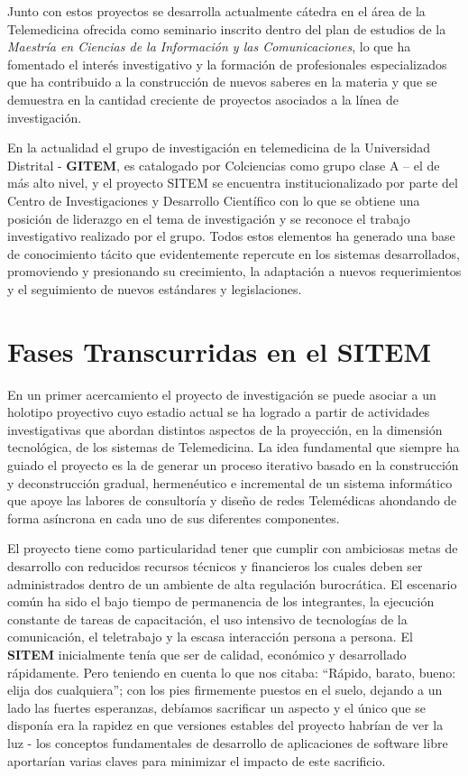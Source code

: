 Junto con estos proyectos se desarrolla actualmente cátedra en el área de la Telemedicina ofrecida como seminario inscrito dentro del plan de estudios de la \textit{Maestría en Ciencias de la Información y las Comunicaciones}, lo que ha fomentado el interés investigativo y la formación de profesionales especializados que ha contribuido a la construcción de nuevos saberes en la materia y que se demuestra en la cantidad creciente de proyectos asociados a la línea de investigación.

En la actualidad el grupo de investigación en telemedicina de la Universidad Distrital - \textbf{GITEM}, es catalogado por Colciencias como grupo clase A – el de más alto nivel, y el proyecto SITEM se encuentra institucionalizado por parte del Centro de Investigaciones y Desarrollo Científico con lo que se obtiene una posición de liderazgo en el tema de investigación y se reconoce el trabajo investigativo realizado por el grupo. Todos estos elementos ha generado una base de conocimiento tácito que evidentemente repercute en los sistemas desarrollados, promoviendo y presionando su crecimiento, la adaptación a nuevos requerimientos y el seguimiento de nuevos estándares y legislaciones.

\section{Fases Transcurridas en el SITEM}
En un primer acercamiento el proyecto de investigación se puede asociar a un holotipo proyectivo\cite{hurtado2000} cuyo estadio actual se ha logrado a partir de actividades investigativas que abordan distintos aspectos de la proyección, en la dimensión tecnológica, de los sistemas de Telemedicina. La idea fundamental que siempre ha guiado el proyecto es la de generar un proceso iterativo basado en la construcción y deconstrucción gradual, hermenéutico e incremental de un sistema informático que apoye las labores de consultoría y diseño de redes Telemédicas ahondando de forma asíncrona en cada uno de sus diferentes componentes. 

El proyecto tiene como particularidad tener que cumplir con ambiciosas metas de desarrollo con reducidos recursos técnicos y financieros los cuales deben ser administrados dentro de un ambiente de alta regulación burocrática. El escenario común ha sido el bajo tiempo de permanencia de los integrantes, la ejecución constante de tareas de capacitación, el uso intensivo de tecnologías de la comunicación, el teletrabajo  y la escasa interacción persona a persona. El \textbf{SITEM} inicialmente tenía que ser de calidad, económico y desarrollado rápidamente. Pero teniendo en cuenta lo que \cite{larman2003} nos citaba: “Rápido, barato, bueno: elija dos cualquiera”; con los pies firmemente puestos en el suelo,  dejando a un lado las fuertes esperanzas, debíamos sacrificar un aspecto y el único que se disponía era la rapidez en que versiones estables del proyecto habrían de ver la luz - los conceptos fundamentales de desarrollo de aplicaciones de software libre aportarían varias claves para minimizar el impacto de este sacrificio.


